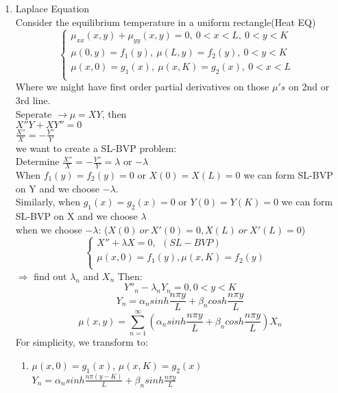 \documentclass[10pt]{article}
\begin{document}
\begin{multicols}{2}
\begin{enumerate}
	\item Laplace Equation\\
		Consider the equilibrium temperature in a uniform rectangle(Heat EQ)
		\begin{equation}
			\left\{
			\begin{array}{lr}
			\mu_{xx}(x,y) + \mu_{yy}(x,y) = 0, \ 0<x<L, \ 0<y<K&\\
			\mu(0,y) = f_1(y), \ \mu(L, y) = f_2(y),  \ 0<y<K &\\
			\mu(x,0)=g_1(x), \ \mu(x,K) = g_2(x), \ 0 < x < L\\
			\end{array}
			\right.
		\end{equation}
		Where we might have first order partial derivatives on those $\mu's$ on 2nd or 3rd line.\\
		Seperate $\rightarrow \mu = XY$, then\\
		$X''Y+XY'' = 0$\\
		$\frac{X''}{X} = -\frac{Y''}{Y}$\\
		we want to create a SL-BVP problem:\\
		Determine $\frac{X''}{X} = -\frac{Y''}{Y} = \lambda$ or $-\lambda$\\
		When $f_1(y) = f_2(y) = 0$ or $X(0) = X(L) = 0$ we can form SL-BVP on Y and we choose $-\lambda$.\\
		Similarly, when $g_1(x)= g_2(x) = 0$ or $Y(0) = Y(K) = 0$ we can form SL-BVP on X and we choose $\lambda$\\
		when we choose $-\lambda$: ($X(0) \ or \ X'(0) = 0, X(L) \ or \ X'(L) = 0$)\\
		\begin{equation}
		\left\{
		\begin{array}{lr}
		X''+\lambda X = 0, \ \ (SL-BVP)&\\
		\mu(x, 0) = f_1(y), \mu(x, K) = f_2(y)\\
		\end{array}
		\right.
		\end{equation}
		$\Rightarrow$ find out $\lambda_n$ and $X_n$ Then:
		$$ Y''_n - \lambda_n Y_n = 0, 0 < y < K$$
		$$ Y_n = \alpha_n sinh\frac{n \pi y}{L} + \beta_n cosh\frac{n \pi y}{L} $$
		$$\mu(x,y) = \sum_{n = 1}^{\infty} (\alpha_n sinh\frac{n \pi y}{L} + \beta_n cosh\frac{n \pi y}{L}) X_n$$
		For simplicity, we transform to:
		\begin{enumerate}
			\item $\mu(x,0) = g_1(x)$, $\mu(x,K) = g_2(x)$\\
			$Y_n = \alpha_n sinh\frac{n \pi (y-K)}{L} + \beta_n sinh\frac{n \pi y}{L}$ 

\end{enumerate}
\end{enumerate}
\end{multicols}
\end{document}
